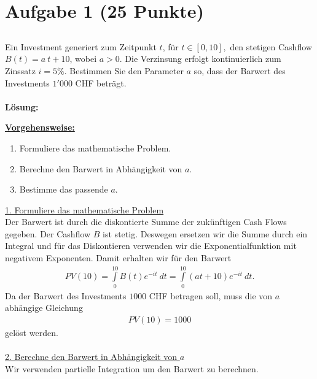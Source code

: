 \vspace{1cm}
\renewcommand{\labelenumi}{\theenumi.}
\section*{Aufgabe 1 (25 Punkte)}
\vspace{0.4cm}
\subsection*{}
Ein Investment generiert zum Zeitpunkt $ t $, für $ t \in [0,10], $ den stetigen Cashflow $ B(t) = a \ t + 10 $,
wobei $ a > 0  $.
Die Verzinsung erfolgt kontinuierlich zum Zinssatz $ i = 5 \% $.
Bestimmen Sie den Parameter $ a $ so, dass der Barwert des Investments $ 1'000 $ CHF beträgt.
\\
\\
\textbf{Lösung:}
\begin{mdframed}
\underline{\textbf{Vorgehensweise:}}
\renewcommand{\labelenumi}{\theenumi.}
\begin{enumerate}
\item Formuliere das mathematische Problem.
\item Berechne den Barwert in Abhängigkeit von $ a $.
\item Bestimme das passende $ a $.

\end{enumerate}
\end{mdframed}
\underline{1. Formuliere das mathematische Problem}\\
Der Barwert ist durch die diskontierte Summe der zukünftigen Cash Flows gegeben.
Der Cashflow $ B $ ist stetig.
Deswegen ersetzen wir die Summe durch ein Integral und für das Diskontieren verwenden wir die Exponentialfunktion mit negativem Exponenten. Damit erhalten wir für den Barwert
\begin{align*}
PV(10) =
\int \limits_0^{10} B(t) e^{-it } \ dt
=
\int \limits_0^{10} (at + 10) e^{-it } \ dt.
\end{align*}
Da der Barwert des Investments $ 1000 $ CHF betragen soll, muss die von $ a $ abhängige Gleichung
\begin{align*}
PV(10) = 1000
\end{align*}
gelöst werden.\\
\\
\underline{2. Berechne den Barwert in Abhängigkeit von $ a $}\\
Wir verwenden partielle Integration um den Barwert zu berechnen.

